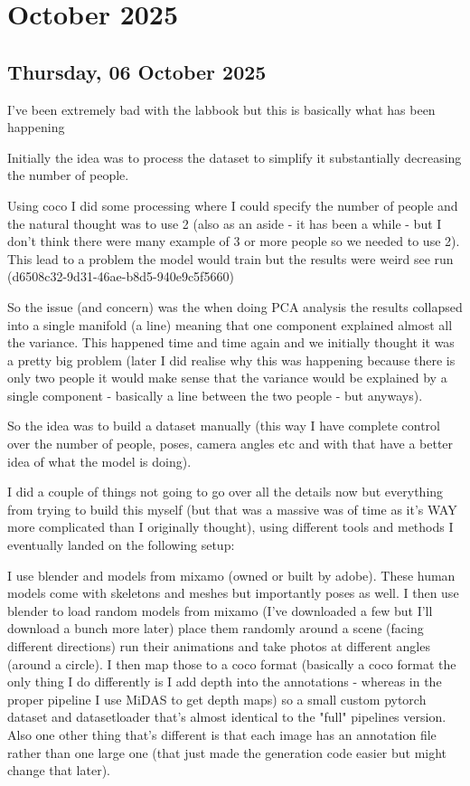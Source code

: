 \chapter[2025 October]{October 2025}

\section[2025/10/06]{Thursday, 06 October 2025}
\label{sec:20251006}

I've been extremely bad with the labbook but this is basically what has been happening

Initially the idea was to process the dataset to simplify it substantially decreasing the number of people.

Using coco I did some processing where I could specify the number of people and the natural thought was to use 2
(also as an aside - it has been a while - but I don't think there were many example of 3 or more people so we needed to use 2).
This lead to a problem the model would train but the results were weird see run (d6508c32-9d31-46ae-b8d5-940e9c5f5660) 

So the issue (and concern) was the when doing PCA analysis the results collapsed into a single manifold (a line)
meaning that one component explained almost all the variance. This happened time and time again and we initially 
thought it was a pretty big problem (later I did realise why this was happening because there is only two people it would 
make sense that the variance would be explained by a single component - basically a line between the two people - but anyways).

So the idea was to build a dataset manually (this way I have complete control over the number of people, poses, camera angles etc and
with that have a better idea of what the model is doing).

I did a couple of things not going to go over all the details now but everything from trying to build this myself (but that was a massive
was of time as it's WAY more complicated than I originally thought), using different tools and methods I eventually landed on the following
setup:

I use blender and models from mixamo (owned or built by adobe). These human models come with skeletons and meshes but importantly
poses as well. I then use blender to load random models from mixamo (I've downloaded a few but I'll download a bunch more later)
place them randomly around a scene (facing different directions) run their animations and take photos at different angles (around
a circle). I then map those to a coco format (basically a coco format the only thing I do differently is I add depth into the
annotations - whereas in the proper pipeline I use MiDAS to get depth maps) so a small custom pytorch dataset and datasetloader 
that's almost identical to the "full" pipelines version. Also one other thing that's different is that each image has an
annotation file rather than one large one (that just made the generation code easier but might change that later).


